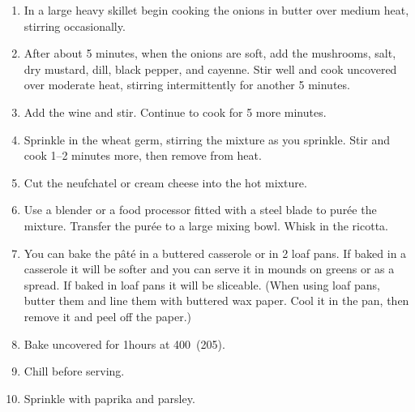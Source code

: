 
\begin{ingredients}
\end{ingredients}


\begin{recipe}
  \begin{enumerate}

  \item In a large heavy skillet begin cooking the onions in butter over medium heat, stirring occasionally.

  \item After about 5 minutes, when the onions are soft, add the
  mushrooms, salt, dry mustard, dill, black pepper, and cayenne.  Stir
  well and cook uncovered over moderate heat, stirring intermittently
  for another 5 minutes.

\item Add the wine and stir.  Continue to cook for 5 more minutes.

\item Sprinkle in the wheat germ, stirring the mixture as you
  sprinkle.  Stir and cook 1--2 minutes more, then remove from heat.

\item Cut the neufchatel or cream cheese into the hot mixture.

\item Use a blender or a food processor fitted with a steel blade to
  pur\'ee the mixture.  Transfer the pur\'ee to a large mixing bowl.
  Whisk in the ricotta.

\item You can bake the p\^at\'e in a buttered casserole or in 2 loaf
  pans.  If baked in a casserole it will be softer and you can serve
  it in mounds on greens or as a spread.  If baked in loaf pans it
  will be sliceable.  (When using loaf pans, butter them and line them
  with buttered wax paper.  Cool it in the pan, then remove it and
  peel off the paper.)

\item Bake uncovered for 1\fracQ hours at 400\F\ (205\degreeC).

\item Chill before serving.

\item Sprinkle with paprika and parsley.

  \end{enumerate}
\end{recipe}
